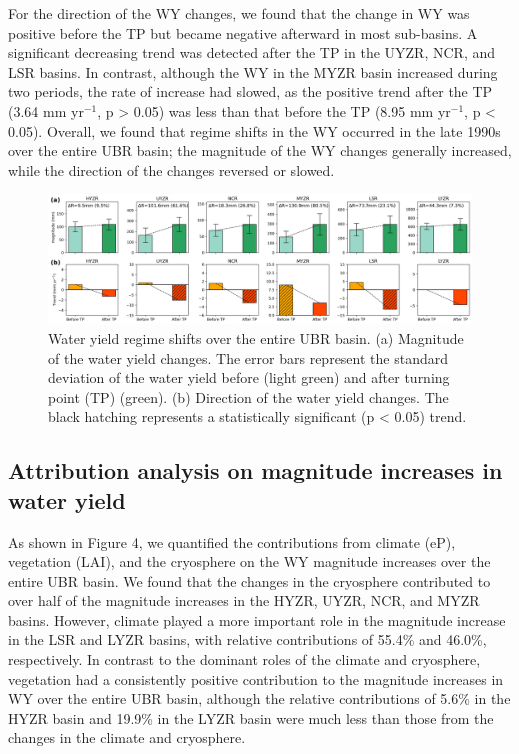 \documentclass[hess, manuscript]{copernicus}
\begin{document}
For the direction of the WY changes, we found that the change in WY was positive before the TP but became negative afterward in most sub-basins. A significant decreasing trend was detected after the TP in the UYZR, NCR, and LSR basins. In contrast, although the WY in the MYZR basin increased during two periods, the rate of increase had slowed, as the positive trend after the TP (3.64 mm yr$^{−1}$, p > 0.05) was less than that before the TP (8.95 mm yr$^{−1}$, p < 0.05). Overall, we found that regime shifts in the WY occurred in the late 1990s over the entire UBR basin; the magnitude of the WY changes generally increased, while the direction of the changes reversed or slowed.

\begin{figure}[t]
\includegraphics[width=12cm]{01-figures/Fig.3.png}
\caption{Water yield regime shifts over the entire UBR basin. (a) Magnitude of the water yield changes. The error bars represent the
standard deviation of the water yield before (light green) and after turning point (TP) (green). (b) Direction of the water yield changes.
The black hatching represents a statistically significant (p < 0.05) trend.}
\label{fig:magnitude-direction}
\end{figure}

\subsection{Attribution analysis on magnitude increases in water yield}
As shown in Figure 4, we quantified the contributions from climate (eP), vegetation (LAI), and the cryosphere on the WY magnitude increases over the entire UBR basin. We found that the changes in the cryosphere contributed to over half of the magnitude increases in the HYZR, UYZR, NCR, and MYZR basins. However, climate played a more important role in the magnitude increase in the LSR and LYZR basins, with relative contributions of 55.4\% and 46.0\%, respectively. In contrast to the dominant roles of the climate and cryosphere, vegetation had a consistently positive contribution to the magnitude increases in WY over the entire UBR basin, although the relative contributions of 5.6\% in the HYZR basin and 19.9\% in the LYZR basin were much less than those from the changes in the climate and cryosphere.
\end{document}
